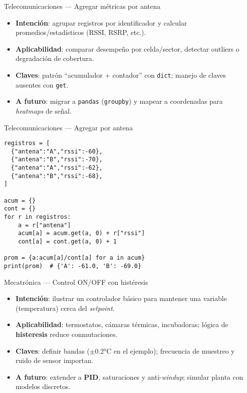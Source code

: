 \documentclass[aspectratio=169,professionalfonts]{beamer}
\begin{document}
\begin{frame}{Telecomunicaciones — Agregar métricas por antena}
\begin{itemize}
  \item \textbf{Intención}: agrupar registros por identificador y calcular promedios/estadísticos (RSSI, RSRP, etc.).
  \item \textbf{Aplicabilidad}: comparar desempeño por celda/sector, detectar outliers o degradación de cobertura.
  \item \textbf{Claves}: patrón “acumulador + contador” con \texttt{dict}; manejo de claves ausentes con \texttt{get}.
  \item \textbf{A futuro}: migrar a \texttt{pandas} (\texttt{groupby}) y mapear a coordenadas para \textit{heatmaps} de señal.
\end{itemize}
\end{frame}

\begin{frame}[fragile]{Telecomunicaciones — Agregar por antena}
\begin{verbatim}
registros = [
  {"antena":"A","rssi":-60},
  {"antena":"B","rssi":-70},
  {"antena":"A","rssi":-62},
  {"antena":"B","rssi":-68},
]

acum = {}
cont = {}
for r in registros:
    a = r["antena"]
    acum[a] = acum.get(a, 0) + r["rssi"]
    cont[a] = cont.get(a, 0) + 1

prom = {a:acum[a]/cont[a] for a in acum}
print(prom)  # {'A': -61.0, 'B': -69.0}
\end{verbatim}
\end{frame}

\begin{frame}{Mecatrónica — Control ON/OFF con histéresis}
\begin{itemize}
  \item \textbf{Intención}: ilustrar un controlador básico para mantener una variable (temperatura) cerca del \textit{setpoint}.
  \item \textbf{Aplicabilidad}: termostatos, cámaras térmicas, incubadoras; lógica de \textbf{histeresis} reduce conmutaciones.
  \item \textbf{Claves}: definir bandas (\(\pm 0.2\)°C en el ejemplo); frecuencia de muestreo y ruido de sensor importan.
  \item \textbf{A futuro}: extender a \textbf{PID}, saturaciones y anti-\textit{windup}; simular planta con modelos discretos.
\end{itemize}
\end{frame}
\end{document}
